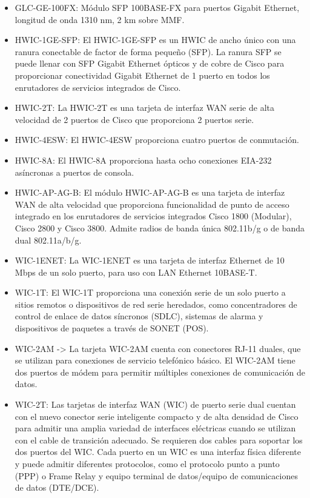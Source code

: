 \documentclass{article}
\begin{document}
\begin{itemize}
    \item GLC-GE-100FX: Módulo SFP 100BASE-FX para puertos Gigabit Ethernet, longitud de onda 1310 nm, 2 km sobre MMF.

    \item HWIC-1GE-SFP: El HWIC-1GE-SFP es un HWIC de ancho único con una ranura conectable de factor de forma pequeño (SFP). La ranura SFP se puede llenar con SFP Gigabit Ethernet ópticos y de cobre de Cisco para proporcionar conectividad Gigabit Ethernet de 1 puerto en todos los enrutadores de servicios integrados de Cisco.

    \item HWIC-2T: La HWIC-2T es una tarjeta de interfaz WAN serie de alta velocidad de 2 puertos de Cisco que proporciona 2 puertos serie.

    \item HWIC-4ESW: El HWIC-4ESW proporciona cuatro puertos de conmutación.

    \item HWIC-8A: El HWIC-8A proporciona hasta ocho conexiones EIA-232 asíncronas a puertos de consola.

    \item HWIC-AP-AG-B: El módulo HWIC-AP-AG-B es una tarjeta de interfaz WAN de alta velocidad que proporciona funcionalidad de punto de acceso integrado en los enrutadores de servicios integrados Cisco 1800 (Modular), Cisco 2800 y Cisco 3800. Admite radios de banda única 802.11b/g o de banda dual 802.11a/b/g.

    \item WIC-1ENET: La WIC-1ENET es una tarjeta de interfaz Ethernet de 10 Mbps de un solo puerto, para uso con LAN Ethernet 10BASE-T.

    \item WIC-1T: El WIC-1T proporciona una conexión serie de un solo puerto a sitios remotos o dispositivos de red serie heredados, como concentradores de control de enlace de datos síncronos (SDLC), sistemas de alarma y dispositivos de paquetes a través de SONET (POS).

    \item WIC-2AM -> La tarjeta WIC-2AM cuenta con conectores RJ-11 duales, que se utilizan para conexiones de servicio telefónico básico. El WIC-2AM tiene dos puertos de módem para permitir múltiples conexiones de comunicación de datos.

    \item WIC-2T: Las tarjetas de interfaz WAN (WIC) de puerto serie dual cuentan con el nuevo conector serie inteligente compacto y de alta densidad de Cisco para admitir una amplia variedad de interfaces eléctricas cuando se utilizan con el cable de transición adecuado. Se requieren dos cables para soportar los dos puertos del WIC. Cada puerto en un WIC es una interfaz física diferente y puede admitir diferentes protocolos, como el protocolo punto a punto (PPP) o Frame Relay y equipo terminal de datos/equipo de comunicaciones de datos (DTE/DCE).


\end{itemize}
\end{document}
